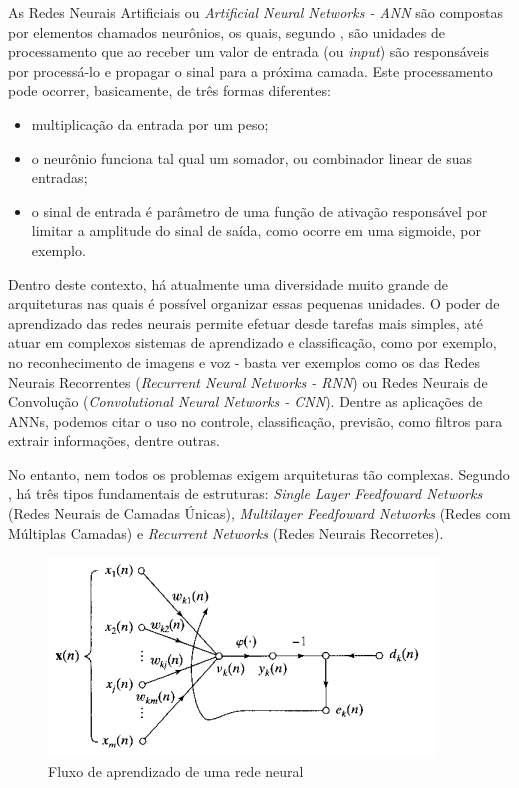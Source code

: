 As Redes Neurais Artificiais ou \textit{Artificial Neural Networks - ANN} são compostas por elementos chamados neurônios, os quais, segundo , são unidades de processamento que ao receber um valor de entrada (ou \textit{input}) são responsáveis por processá-lo e propagar o sinal para a próxima camada. Este processamento pode ocorrer, basicamente, de três formas diferentes: 
\begin{itemize}[noitemsep]
	\item multiplicação da entrada por um peso; 
	\item o neurônio funciona tal qual um somador, ou combinador linear de suas entradas;
	\item o sinal de entrada é parâmetro de uma função de ativação responsável por limitar a amplitude do sinal de saída, como ocorre em uma sigmoide, por exemplo.
\end{itemize}

Dentro deste contexto, há atualmente uma diversidade muito grande de arquiteturas nas quais é possível organizar essas pequenas unidades. O poder de aprendizado das redes neurais permite efetuar desde tarefas mais simples, até atuar em complexos sistemas de aprendizado e classificação, como por exemplo, no reconhecimento de imagens e voz - basta ver exemplos como os das Redes Neurais Recorrentes (\textit{Recurrent Neural Networks - RNN})\cite{rnn} ou Redes Neurais de Convolução (\textit{Convolutional Neural Networks - CNN}). Dentre as aplicações de ANNs, podemos citar o uso no controle, classificação, previsão, como filtros para extrair informações, dentre outras. 

No entanto, nem todos os problemas exigem arquiteturas tão complexas. Segundo , há três tipos fundamentais de estruturas: \textit{Single Layer Feedfoward Networks} (Redes Neurais de Camadas Únicas), \textit{Multilayer Feedfoward Networks} (Redes com Múltiplas Camadas) e \textit{Recurrent Networks} (Redes Neurais Recorretes).

\begin{figure}[ht!]
	\caption{Fluxo de aprendizado de uma rede neural}
	\label{fig:annfluxo}
	\begin{center}
		\includegraphics[scale=0.8]{img/annflowlearning.png}
	\end{center}
\end{figure}

